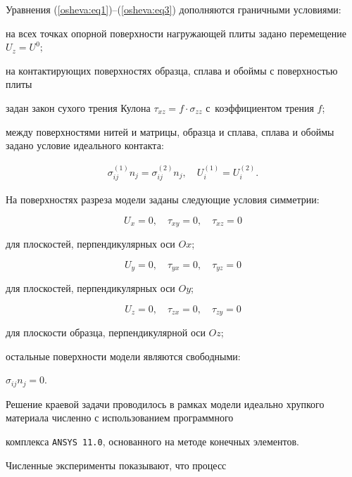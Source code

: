Уравнения (\ref{osheva:eq1})--(\ref{osheva:eq3}) дополняются граничными условиями: 

на всех точках опорной поверхности нагружающей плиты задано перемещение $U_z =U^0;$

на контактирующих поверхностях образца, сплава и обоймы с поверхностью плиты

задан закон сухого трения Кулона $\tau_{xz} =f \cdot \sigma_{zz}$ с~коэффициентом трения $f$;

между поверхностями нитей и матрицы, образца и сплава, сплава и обоймы задано условие идеального контакта:

\begin{gather*}

\sigma _{ij}^{(1)} n_j =\sigma _{ij}^{(2)} n_j,\quad 

U_i^{(1)} =U_i^{(2)}.

\end{gather*}

На поверхностях разреза модели заданы следующие условия симметрии:

$$

U_x =0, \quad \tau _{xy} =0, \quad \tau _{xz} =0

$$

для плоскостей, перпендикулярных оси $Ox$;

$$

U_y =0, \quad  \tau _{yx} =0, \quad \tau _{yz} =0

$$

для плоскостей, перпендикулярных оси $Oy$;

$$

U_z =0, \quad \tau _{zx} =0, \quad \tau _{zy} =0

$$

для плоскости образца, перпендикулярной оси $Oz$;

остальные поверхности модели являются свободными:

$

\sigma _{ij} n_j =0.

$



Решение краевой задачи проводилось в рамках модели идеально хрупкого материала численно с использованием программного

комплекса {\tt ANSYS 11.0}, основанного на методе конечных элементов.



\smallskip



 Численные эксперименты показывают, что процесс

